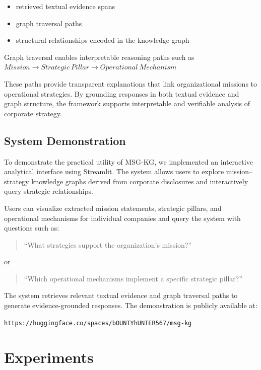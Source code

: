 \documentclass[11pt]{article}
\begin{document}
\begin{itemize}[leftmargin=1.0em, itemsep=0.05em, topsep=0.05em]
\item retrieved textual evidence spans
\item graph traversal paths
\item structural relationships encoded in the knowledge graph
\end{itemize}

Graph traversal enables interpretable reasoning paths such as
$Mission \rightarrow Strategic\ Pillar \rightarrow Operational\ Mechanism$

These paths provide transparent explanations that link organizational missions to operational strategies. By grounding responses in both textual evidence and graph structure, the framework supports interpretable and verifiable analysis of corporate strategy.

\subsection{System Demonstration}

To demonstrate the practical utility of MSG-KG, we implemented an interactive analytical interface using Streamlit. The system allows users to explore mission--strategy knowledge graphs derived from corporate disclosures and interactively query strategic relationships.

Users can visualize extracted mission statements, strategic pillars, and operational mechanisms for individual companies and query the system with questions such as:

\begin{quote}
``What strategies support the organization's mission?''
\end{quote}

or

\begin{quote}
``Which operational mechanisms implement a specific strategic pillar?''
\end{quote}

The system retrieves relevant textual evidence and graph traversal paths to generate evidence-grounded responses. The demonstration is publicly available at:

\begin{center}
\texttt{https://huggingface.co/spaces/bOUNTYhUNTER567/msg-kg}
\end{center}

\section{Experiments}
\end{document}
